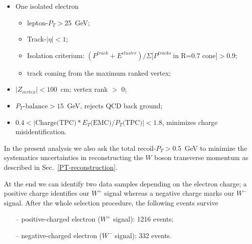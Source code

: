 \documentclass[12pt]{article}
\begin{document}
\begin{itemize}
\item One isolated electron
    \begin{itemize}
    \item lepton-$P_{T}>25$~GeV;
    \item Track-$|\eta|<1$;
    \item Isolation criterium: $(P^{track}+E^{cluster})/\Sigma[P^{tracks}~\text{in R=0.7 cone]} > 0.9$;
    \item track coming from the maximum ranked vertex;
    \end{itemize}
\item $|Z_{vertex}| < 100$~cm; vertex rank $>$ 0;    
\item $P_{T}\text{-balance} > 15$~GeV, rejects QCD back ground;
\item $0.4 < |\text{Charge(TPC)}*E_{T}\text{(EMC)}/P_{T}\text{(TPC)}| < 1.8$, minimizes charge misidentification.
\end{itemize}

In the present analysis we also ask the total recoil-$P_{T} > 0.5$~GeV to minimize the systematics uncertainties in reconstructing the $W$ boson transverse momentum as described in Sec.~\ref{PT-reconstruction}.

At the end we can identify two data samples depending on the electron charge; a positive charge identifies our $W^{+}$ signal whereas a negative charge marks our $W^{-}$ signal. After the whole selection procedure, the following events survive
\begin{itemize}
\item[--] positive-charged electron ($W^{+}$ signal): 1216 events;
\item[--] negative-charged electron ($W^{-}$ signal): 332 events.
\end{itemize}

 
\end{document}
